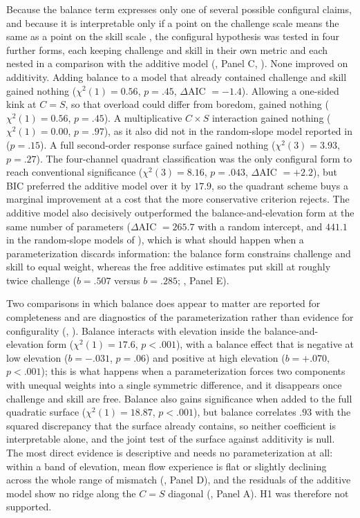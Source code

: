 \documentclass[11pt,a4paper]{article}
\begin{document}
Because the balance term expresses only one of several possible configural claims, and because it
is interpretable only if a point on the challenge scale means the same as a point on the skill
scale \citep{edwards1993polynomial}, the configural hypothesis was tested in four further forms,
each keeping challenge and skill in their own metric and each nested in a comparison with the
additive model (, Panel C, ). None improved on additivity.
Adding balance to a model that already contained challenge and skill gained nothing
($\chi^2(1)=0.56$, $p=.45$, $\Delta$AIC $=-1.4$). Allowing a one-sided kink at $C=S$, so that
overload could differ from boredom, gained nothing ($\chi^2(1)=0.56$, $p=.45$). A multiplicative
$C \times S$ interaction gained nothing ($\chi^2(1)=0.00$, $p=.97$), as it also did not in the
random-slope model reported in  ($p=.15$). A full second-order response
surface gained nothing ($\chi^2(3)=3.93$, $p=.27$). The four-channel quadrant classification was
the only configural form to reach conventional significance ($\chi^2(3)=8.16$, $p=.043$,
$\Delta$AIC $=+2.2$), but BIC preferred the additive model over it by $17.9$, so the quadrant
scheme buys a marginal improvement at a cost that the more conservative criterion rejects. The
additive model also decisively outperformed the balance-and-elevation form at the same number of
parameters ($\Delta$AIC $=265.7$ with a random intercept, and $441.1$ in the random-slope models
of ), which is what should happen when a parameterization discards information:
the balance form constrains challenge and skill to equal weight, whereas the free additive estimates
put skill at roughly twice challenge ($b=.507$ versus $b=.285$; , Panel E).

Two comparisons in which balance does appear to matter are reported for completeness and are
diagnostics of the parameterization rather than evidence for configurality
(, ). Balance interacts with elevation inside the
balance-and-elevation form ($\chi^2(1)=17.6$, $p<.001$), with a balance effect that is negative at
low elevation ($b=-.031$, $p=.06$) and positive at high elevation ($b=+.070$, $p<.001$); this is
what happens when a parameterization forces two components with unequal weights into a single
symmetric difference, and it disappears once challenge and skill are free. Balance also gains
significance when added to the full quadratic surface ($\chi^2(1)=18.87$, $p<.001$), but balance
correlates $.93$ with the squared discrepancy that the surface already contains, so neither
coefficient is interpretable alone, and the joint test of the surface against additivity is null.
The most direct evidence is descriptive and needs no parameterization at all: within a band of
elevation, mean flow experience is flat or slightly declining across the whole range of mismatch
(, Panel D), and the residuals of the additive model show no ridge along the
$C=S$ diagonal (, Panel A). H1 was therefore not supported.
\end{document}

